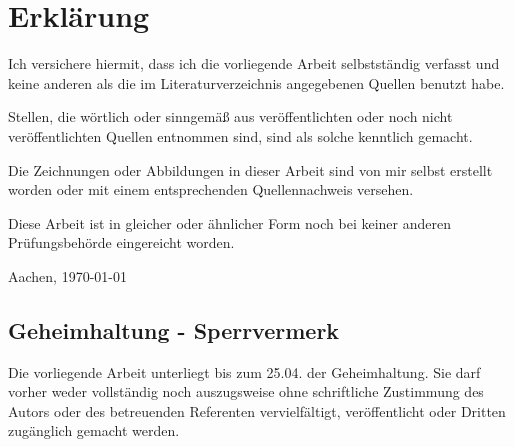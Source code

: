 \clearpage
\chapter*{Erklärung}\label{erklaerung}
Ich versichere hiermit, dass ich die vorliegende Arbeit selbstständig verfasst und keine anderen als die im Literaturverzeichnis angegebenen Quellen benutzt habe.

\bigskip

Stellen, die wörtlich oder sinngemäß aus veröffentlichten oder noch nicht veröffentlichten Quellen entnommen sind, sind als solche kenntlich gemacht.

\bigskip

Die Zeichnungen oder Abbildungen in dieser Arbeit sind von mir selbst erstellt worden oder mit einem entsprechenden Quellennachweis versehen.

\bigskip

Diese Arbeit ist in gleicher oder ähnlicher Form noch bei keiner anderen Prüfungsbehörde eingereicht worden.

\vspace{1cm}
Aachen, \today %

\vspace{7cm}
\section*{Geheimhaltung - Sperrvermerk}\label{geheimhaltung}

Die vorliegende Arbeit unterliegt bis zum 25.04. der Geheimhaltung. Sie darf vorher weder vollständig noch auszugsweise ohne schriftliche Zustimmung des Autors oder des betreuenden Referenten vervielfältigt, veröffentlicht oder Dritten zugänglich gemacht werden.